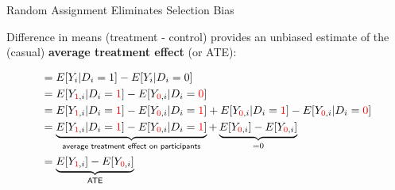 \documentclass[10pt,xcolor=table,ignorenonframetext,handout,aspectratio=169]{beamer}
\begin{document}
\begin{frame}{Random Assignment Eliminates Selection Bias}

\medskip
Difference in means (treatment - control) provides an unbiased estimate of 
the (casual) \textbf{average treatment effect} (or ATE):
\medskip
\begin{small}
	\begingroup
	\addtolength{\jot}{1em}
	\begin{align*}
	&= E [ Y_i \vert D_i = 1 ] - E [ Y_i \vert D_i = 0 ]\\
	& = E [ Y_{\color{red}1 \color{black},i} \vert D_i = \color{red}1\color{black} ]
	- E [ Y_{\color{red}0\color{black},i} \vert D_i = \color{red}0\color{black} ] \\
	&= E [ Y_{\color{red}1 \color{black},i} \vert D_i = \color{red}1\color{black} ]
	- E [ Y_{\color{red}0\color{black},i} \vert D_i = \color{red}1\color{black} ]
	+ E [ Y_{\color{red}0\color{black},i} \vert D_i = \color{red}1\color{black} ]
	- E [ Y_{\color{red}0\color{black},i} \vert D_i = \color{red}0\color{black} ] \\
	&= \underbrace{E [ Y_{\color{red}1 \color{black},i} \vert D_i = \color{red}1\color{black} ]
		- E [ Y_{\color{red}0\color{black},i} \vert D_i = \color{red}1\color{black} ]}_{\textsf{average treatment effect on participants}}
	+ \underbrace{E [ Y_{\color{red}0\color{black},i} ] - E [ Y_{\color{red}0\color{black},i}  ]}_{=0} \\
	&= \underbrace{E [ Y_{\color{red}1 \color{black},i} ] - E [ Y_{\color{red}0 \color{black},i} ]}_{\textsf{ATE}}
	\end{align*}
	\endgroup
\end{small}


\end{frame}



\end{document}
